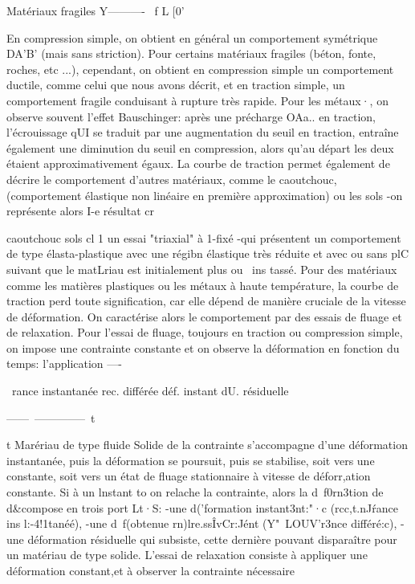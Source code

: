 Matériaux fragiles 
Y----------~ f L 
[0' 

En compression simple, on obtient en général un comportement symétrique DA'B' 
(mais sans striction). Pour certains matériaux fragiles (béton, fonte, roches, etc ...), cependant, on obtient en compression simple un comportement ductile, comme celui que nous avons décrit, et en traction simple, un comportement fragile conduisant à rupture très rapide. Pour les métaux·, on observe souvent l'effet Bauschinger: après une précharge OAa.. en traction, l'écrouissage qUI se traduit par une augmentation du seuil en traction, entraîne également une 
diminution du seuil en compression, alors qu'au départ les deux étaient approximativement égaux. La courbe de traction permet également de décrire le comportement d'autres matériaux, comme le caoutchouc, (comportement élastique non linéaire en première approximation) ou les sols -on représente alors I-e résultat 
cr 


caoutchouc sols 
cl 1 un essai "triaxial" à 1-fixé -qui présentent un comportement de type 
élasta-plastique avec une régibn élastique très réduite et avec ou sans plC 
suivant que le matLriau est initialement plus ou ~ins tassé. 
Pour des matériaux comme les matières plastiques ou les métaux à haute température, la courbe de traction perd toute signification, car elle dépend de manière cruciale de la vitesse de déformation. On caractérise alors le comportement par des essais de fluage et de relaxation. Pour l'essai de fluage, toujours en traction ou compression simple, on impose une contrainte constante et on observe la déformation en fonction du temps: l'application 
----­

~rance 
instantanée 
rec. différée 
déf. 
instant dU. résiduelle 

------~--------------~t 

t 
Marériau de type fluide Solide 
de la contrainte s'accompagne d'une déformation instantanée, puis la déforma­tion se poursuit, puis se stabilise, soit vers une constante, soit vers un état de fluage stationnaire à vitesse de déforr,ation constante. Si à un lns­tant to on relache la contrainte, alors la d~f0rn3tion de d&compose en trois port Lt·S: 
-une d('formation instant3nt:"·c (rcc,t.nJ\'rance ins l:-4!1tanéé), 
-une d~f(\rmation obtenue rn)lre.ssÎvCr:Jént (Y"~LOUV'r3nce différé:c), 
-une déformation résiduelle qui subsiste, cette dernière pouvant disparaître pour un matériau de type solide. 
L'essai de relaxation consiste à appliquer une déformation constant,­et à observer la contrainte nécessaire 

